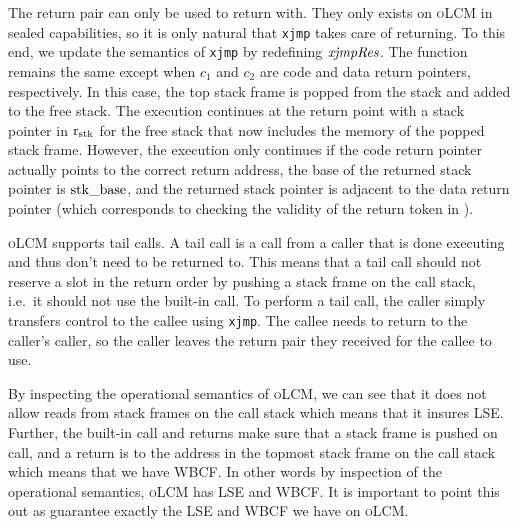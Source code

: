 \documentclass[acmsmall,review,anonymous]{acmart}\settopmatter{printfolios=true,printccs=false,printacmref=false}
\newcommand{\xjmpres}[1]{\plainfun{xjmpRes}{#1}}
\newcommand{\srccm}{\textsc{oLCM}}
\begin{document}
The return pair can only be used to return with.
They only exists on \srccm{} in sealed capabilities, so it is only natural that \texttt{xjmp} takes care of returning.
To this end, we update the semantics of \texttt{xjmp} by redefining $\xjmpres{}$.
The function remains the same except when $c_1$ and $c_2$ are code and data return pointers, respectively.
In this case, the top stack frame is popped from the stack and added to the free stack.
The execution continues at the return point with a stack pointer in $\mathrm{r}_\mathrm{stk}$ for the free stack that now includes the memory of the popped stack frame.
However, the execution only continues if the code return pointer actually points to the correct return address, the base of the returned stack pointer is $\mathrm{stk\_base}$, and the returned stack pointer is adjacent to the data return pointer (which corresponds to checking the validity of the return token in \stktokens{}).

\srccm{} supports tail calls.
A tail call is a call from a caller that is done executing and thus don't need to be returned to.
This means that a tail call should not reserve a slot in the return order by pushing a stack frame on the call stack, i.e.\ it should not use the built-in call.
To perform a tail call, the caller simply transfers control to the callee using \texttt{xjmp}.
The callee needs to return to the caller's caller, so the caller leaves the return pair they received for the callee to use.

By inspecting the operational semantics of \srccm{}, we can see that it does not allow reads from stack frames on the call stack which means that it insures LSE.
Further, the built-in call and returns make sure that a stack frame is pushed on call, and a return is to the address in the topmost stack frame on the call stack which means that we have WBCF.
In other words by inspection of the operational semantics, \srccm{} has LSE and WBCF.
It is important to point this out as \stktokens{} guarantee exactly the LSE and WBCF we have on \srccm{}.
\end{document}
